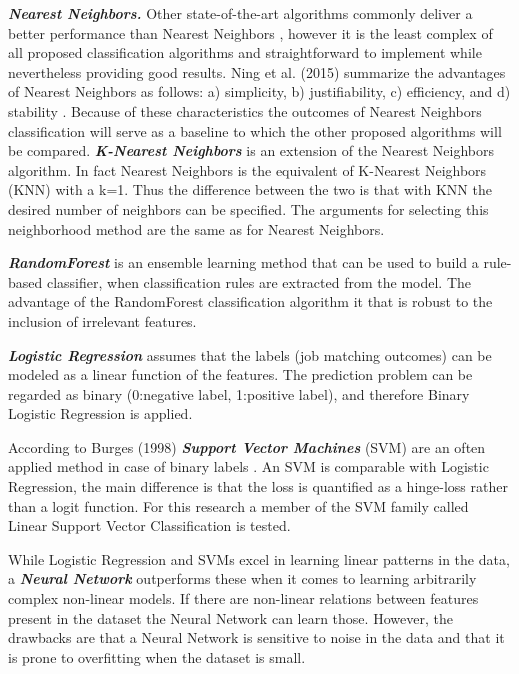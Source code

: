 \textbf{\textit{Nearest Neighbors.}}
Other state-of-the-art algorithms commonly deliver a better performance than Nearest Neighbors \cite{koren2008factorization, takacs2007major}, however it is the least complex of all proposed classification algorithms and straightforward to implement while nevertheless providing good results.
Ning et al. (2015) summarize the advantages of Nearest Neighbors as follows: a) simplicity, b) justifiability, c) efficiency, and d) stability \cite{ning2015comprehensive}.
Because of these characteristics the outcomes of Nearest Neighbors classification will serve as a baseline to which the other proposed algorithms will be compared.
\textbf{\textit{K-Nearest Neighbors}} \cite{altman1992introduction} is an extension of the Nearest Neighbors algorithm. 
In fact Nearest Neighbors is the equivalent of K-Nearest Neighbors (KNN) with a k=1. 
Thus the difference between the two is that with KNN the desired number of neighbors can be specified.
The arguments for selecting this neighborhood method are the same as for Nearest Neighbors.

\textbf{\textit{RandomForest}} \cite{breiman2001random} is an ensemble learning method that can be used to build a rule-based classifier, when classification rules are extracted from the model.
The advantage of the RandomForest classification algorithm it that is robust to the inclusion of irrelevant features.

\textbf{\textit{Logistic Regression}} \cite{hosmer2013applied} assumes that the labels (job matching outcomes) can be modeled as a linear function of the features.
The prediction problem can be regarded as binary (0:negative label, 1:positive label), and therefore Binary Logistic Regression is applied.

According to Burges (1998) \textbf{\textit{Support Vector Machines}} (SVM) are an often applied method in case of binary labels \cite{burges1998tutorial}.
An SVM is comparable with Logistic Regression, the main difference is that the loss is quantified as a hinge-loss rather than a logit function. 
For this research a member of the SVM family called Linear Support Vector Classification is tested.

While Logistic Regression and SVMs excel in learning linear patterns in the data, a \textbf{\textit{Neural Network}} \cite{bishop1995neural} outperforms these when it comes to learning arbitrarily complex non-linear models.
If there are non-linear relations between features present in the dataset the Neural Network can learn those.
However, the drawbacks are that a Neural Network is sensitive to noise in the data and that it is prone to overfitting when the dataset is small. 

